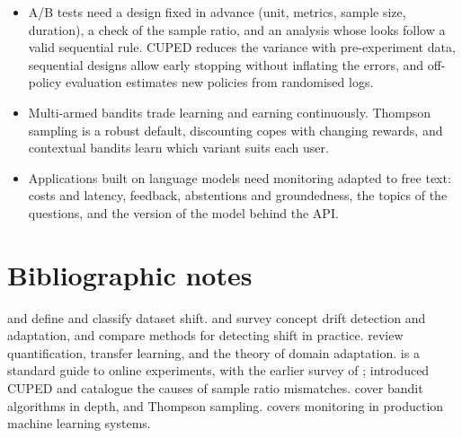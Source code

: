 \begin{itemize}
        training--serving skew or the reaction of users; shadow mode catches the first, and canaries catch large problems with
        little exposure.
  \item A/B tests need a design fixed in advance (unit, metrics, sample size, duration), a check of the sample ratio, and an analysis
        whose looks follow a valid sequential rule. CUPED reduces the variance with pre-experiment data, sequential designs allow early stopping without
        inflating the errors, and off-policy evaluation estimates new policies from randomised logs.
  \item Multi-armed bandits trade learning and earning continuously. Thompson sampling is a robust default, discounting copes with
        changing rewards, and contextual bandits learn which variant suits each user.
  \item Applications built on language models need monitoring adapted to free text: costs and latency, feedback,
        abstentions and groundedness, the topics of the questions, and the version of the model behind the API.
\end{itemize}

\section*{Bibliographic notes}

\citet{quinonero2009dataset} and \citet{morenotorres2012unifying} define and classify dataset shift. \citet{gama2014survey} and
\citet{lu2019learning} survey concept drift detection and adaptation, and \citet{rabanser2019failing} compare methods for detecting
shift in practice. \citet{gonzalez2017review} review quantification, \citet{pan2010survey} transfer learning, and
\citet{bendavid2010theory} the theory of domain adaptation. \citet{kohavi2020trustworthy} is a standard guide to online
experiments, with the earlier survey of \citet{kohavi2009controlled}; \citet{deng2013improving} introduced CUPED and
\citet{fabijan2019diagnosing} catalogue the causes of sample ratio mismatches. \citet{lattimore2020bandit} cover bandit algorithms in
depth, and \citet{russo2018tutorial} Thompson sampling. \citet{huyen2022designing} covers monitoring in production machine learning
systems.

